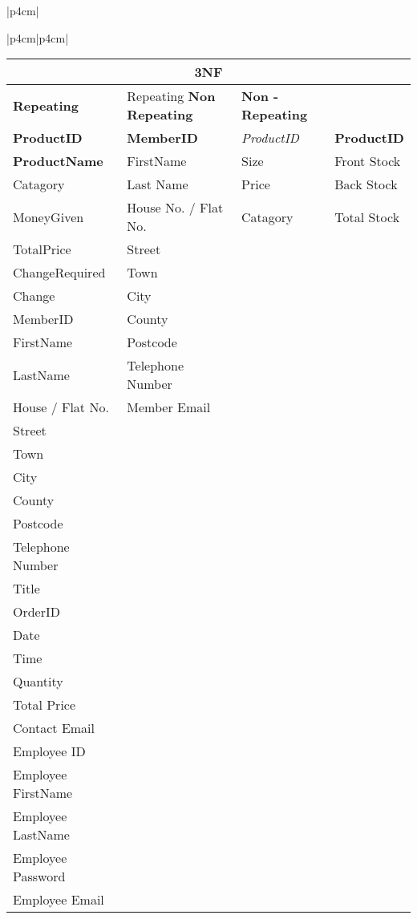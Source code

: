 \begin{center}
\begin{tabular}{|p{4cm}|}
\begin{center}
\begin{tabular}{|p{4cm}|p{4cm}|}
\begin{center}
    \begin{tabular}{|p{4cm}|p{4cm}|p{4cm}p{4cm}|}
        \hline
	 \multicolumn{4}{|c|}{3NF} \\ \hline
	\textbf{Repeating} & {Repeating} \textbf{Non Repeating} & \textbf{Non - Repeating}\\ \hline
	\textbf{ProductID}  & \textbf{MemberID} & \textit{ProductID} & \textbf{ProductID}\\ \hline
	\textbf{ProductName} & {FirstName} &{Size} & {Front Stock}\\ \hline
	{Catagory} & {Last Name} & {Price} & {Back Stock}\\ \hline
	{MoneyGiven} & {House No. / Flat No.} & {Catagory} & {Total Stock}\\ \hline
	{TotalPrice} & {Street} & {}\\ \hline
	{ChangeRequired} & {Town} & {}\\ \hline
	{Change} & {City} & {}\\ \hline
	{MemberID} & {County} & {}\\ \hline
	{FirstName} & {Postcode} & {}\\ \hline
	{LastName} & {Telephone Number} & {}\\ \hline
	{House / Flat No.} & {Member Email} & {}\\ \hline
	{Street} & {}\\ \hline
	{Town} & {}\\ \hline
	{City} & {}\\ \hline
	{County} & {}\\ \hline
	{Postcode} & {}\\ \hline
	{Telephone Number} & {}\\ \hline
	{Title} & {}\\ \hline
	{OrderID} & {}\\ \hline
	{Date} & {}\\ \hline
	{Time} & {}\\ \hline
	{Quantity} & {}\\ \hline
	{Total Price} & {}\\ \hline
	{Contact Email} & {}\\ \hline
	{Employee ID} & {}\\ \hline
	{Employee FirstName} & {}\\ \hline
	{Employee LastName} & {}\\ \hline
	{Employee Password} & {}\\ \hline
	{Employee Email} & {}\\ \hline
    \end{tabular}
\end{center}


\end{tabular}
\end{center}
\end{tabular}
\end{center}
